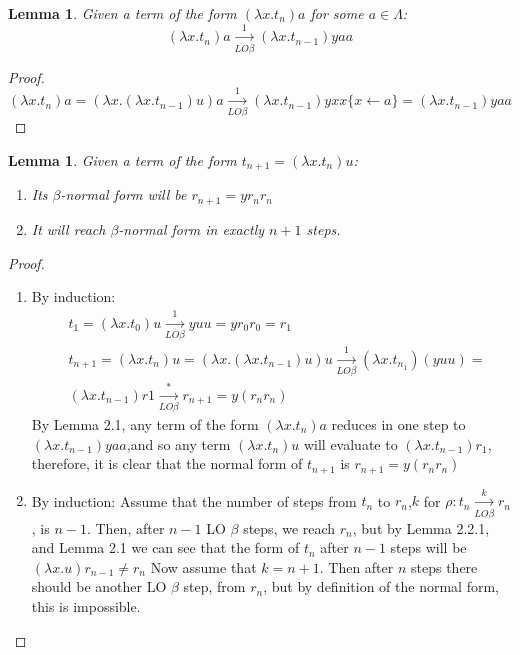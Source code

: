 \documentclass[11pt]{article}
\newtheorem{lemma}[theorem]{Lemma}
\begin{document}
\begin{lemma}\label{lemma1}
  Given a term of the form $(\lambda x .t_n)a$ for some $a \in \Lambda$:
  \begin{equation}
    (\lambda x .t_n)a \xrightarrow[LO \beta]{1} (\lambda x.t_{n-1})yaa
  \end{equation}
\end{lemma}
\begin{proof}
  \begin{equation}
    (\lambda x . t_n)a = (\lambda x .(\lambda x .t_{n-1})u)a \xrightarrow[LO \beta]{1} (\lambda x . t_{n-1})yxx \{ x \leftarrow a \} = (\lambda x .t_{n-1})yaa
  \end{equation}
\end{proof}
\begin{lemma}
  Given a term of the form $t_{n+1} = (\lambda x. t_n)u$:
  \begin{enumerate}
    \item Its $\beta$-normal form will be $r_{n+1} = yr_{n}r_{n}$
    \item It will reach $\beta$-normal form in exactly $n+1$ steps.
  \end{enumerate}
\end{lemma}
\begin{proof}
  \begin{enumerate}
    \item By induction:
          \begin{equation}
            \begin{split}
              & t_1 = (\lambda x .t_0)u \xrightarrow[LO\beta]{1} yuu = yr_0r_0 = r_1 \\
              & t_{n+1} = (\lambda x .t_n) u = (\lambda x. (\lambda x . t_{n-1})u)u \xrightarrow[LO\beta]{1} (\lambda x .t_{n_1})(yuu) = \\
              & (\lambda x. t_{n -1})r1 \xrightarrow[LO\beta]{*}r_{n+1} = y(r_{n}r_{n})
            \end{split}
          \end{equation}
          By Lemma 2.1, any term of the form $(\lambda x. t_n)a$ reduces in one step to $(\lambda  x .t_{n-1})yaa$,and so any term $(\lambda x.t_n)u$ will evaluate to $(\lambda x .t_{n-1})r_1$, therefore, it is clear that the normal form of $t_{n+1}$ is $r_{n+1} = y(r_n r_n)$
    \item By induction:
          Assume that the number of steps from $t_n$ to $r_n$,$k$ for $\rho  : t_n \xrightarrow[LO\beta]{k} r_n$, is $n-1$. Then, after $n-1$ LO $\beta$ steps, we reach $r_n$, but by Lemma 2.2.1, and Lemma 2.1 we can see that the form of $t_n$ after $n-1$ steps will be $(\lambda x . u)r_{n-1} \neq r_n$
          Now assume that $k = n+1$. Then after $n$ steps there should be another LO $\beta$ step, from $r_n$, but by definition of the normal form, this is impossible.

  \end{enumerate}
\end{proof}
\end{document}
